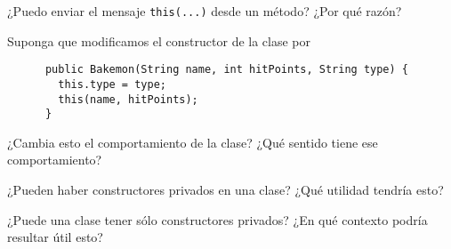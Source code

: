   \begin{exercise}
    ¿Puedo enviar el mensaje \texttt{this(...)} desde un método?
    ¿Por qué razón?
  \end{exercise}

  \begin{exercise}
    Suponga que modificamos el constructor de la clase por
    \begin{verbatim}
      public Bakemon(String name, int hitPoints, String type) {
        this.type = type;
        this(name, hitPoints);
      }
    \end{verbatim}
    ¿Cambia esto el comportamiento de la clase?
    ¿Qué sentido tiene ese comportamiento?
  \end{exercise}

  \begin{exercise}
    ¿Pueden haber constructores privados en una clase?
    ¿Qué utilidad tendría esto?  
  \end{exercise}

  \begin{exercise}
    ¿Puede una clase tener sólo constructores privados?
    ¿En qué contexto podría resultar útil esto?
  \end{exercise}

